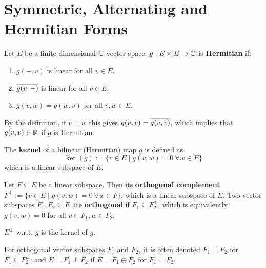 \documentclass{article}
\begin{document}
\section{Symmetric, Alternating and Hermitian Forms}

\begin{definition}[Hermitian]
    Let $E$ be a finite-dimensional $\mathbb{C}$-vector space. $g: E \times E \to \mathbb{C}$ is \textbf{Hermitian} if:
    \begin{enumerate}[label=\roman*)]
        \item $g(-, v)$ is linear for all $v \in E$. 
        \item $\overline{g(v, -)}$ is linear for all $v \in E$.
        \item $g(v, w) = \overline{g(w, v)}$ for all $v, w \in E$.
    \end{enumerate}
\end{definition}

\begin{remark}
    By the definition, if $v = w$ this gives $g(v, v) = \overline{g(v, v)}$, which implies that $g(v, v) \in \mathbb{R}$ if $g$ is Hermitian.
\end{remark}

\begin{definition}
    The \textbf{kernel} of a bilinear (Hermitian) map $g$ is defined as
    \[
        \ker(g) := \{v \in E \mid g(v, w) = 0\ \forall w \in E \}
    \]
    which is a linear subspace of $E$.
\end{definition}

\begin{definition}[Orthogonality]
    Let $F \subseteq E$ be a linear subspace. Then its \textbf{orthogonal complement} $F^{\perp} := \{v \in E \mid g(v, w) = 0\ \forall w \in F\}$. which is a linear subspace of $E$. Two vector subspaces $F_1, F_2 \subseteq E$ are \textbf{orthogonal} if $F_1 \subseteq F_2^{\perp}$, which is equivalently $g(v, w) = 0$ for all $v \in F_1, w \in F_2$.
\end{definition}

\begin{example}
    $E^{\perp}$ w.r.t. $g$ is the kernel of $g$. 
\end{example}

\begin{remark}
    For orthogonal vector subspaces $F_1$ and $F_2$, it is often denoted $F_1 \perp F_2$ for $F_1 \subseteq F_2^{\perp}$; and $E = F_1 \perp F_2$ if $E = F_1 \oplus F_2$ for $F_1 \perp F_2$.
\end{remark}
\end{document}
